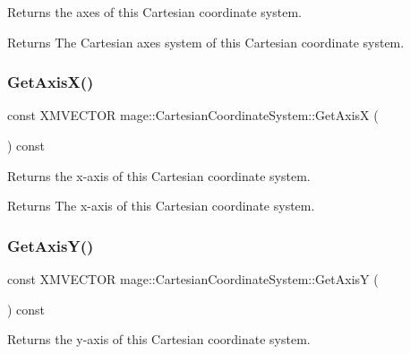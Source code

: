 Returns the axes of this Cartesian coordinate system.

\begin{DoxyReturn}{Returns}
The Cartesian axes system of this Cartesian coordinate system. 
\end{DoxyReturn}
\hypertarget{structmage_1_1_cartesian_coordinate_system_a00947f77f6af53596d00ee76e0486430}{}\label{structmage_1_1_cartesian_coordinate_system_a00947f77f6af53596d00ee76e0486430} 
\subsubsection{\texorpdfstring{Get\+Axis\+X()}{GetAxisX()}}
{\footnotesize\ttfamily const X\+M\+V\+E\+C\+T\+OR mage\+::\+Cartesian\+Coordinate\+System\+::\+Get\+AxisX (\begin{DoxyParamCaption}{ }\end{DoxyParamCaption}) const\hspace{0.3cm}{\ttfamily [noexcept]}}

Returns the x-\/axis of this Cartesian coordinate system.

\begin{DoxyReturn}{Returns}
The x-\/axis of this Cartesian coordinate system. 
\end{DoxyReturn}
\hypertarget{structmage_1_1_cartesian_coordinate_system_a5e625320f8d7c3b0c46fe89c51d9e8ec}{}\label{structmage_1_1_cartesian_coordinate_system_a5e625320f8d7c3b0c46fe89c51d9e8ec} 
\subsubsection{\texorpdfstring{Get\+Axis\+Y()}{GetAxisY()}}
{\footnotesize\ttfamily const X\+M\+V\+E\+C\+T\+OR mage\+::\+Cartesian\+Coordinate\+System\+::\+Get\+AxisY (\begin{DoxyParamCaption}{ }\end{DoxyParamCaption}) const\hspace{0.3cm}{\ttfamily [noexcept]}}

Returns the y-\/axis of this Cartesian coordinate system.

